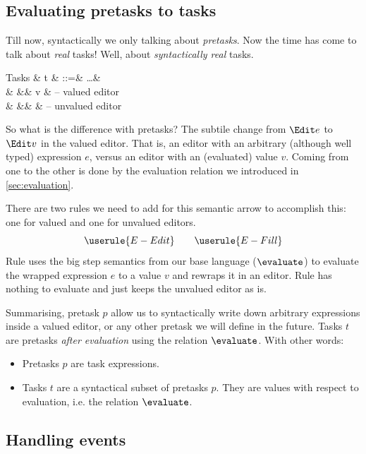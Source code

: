 \subsection{Evaluating pretasks to tasks}
\label{sec:tasks-vs-pretasks}

Till now, syntactically we only talking about \emph{pretasks}.
Now the time has come to talk about \emph{real} tasks!
Well, about \emph{syntactically real} tasks.
\begin{grammar}
  Tasks
    & t & ::=& \ldots      & \\
    &   &\mid& \Edit v     & – valued editor \\
    &   &\mid& \Fill \beta & – unvalued editor \\
\end{grammar}

So what is the difference with pretasks?
The subtile change from $\Edit e$ to $\Edit v$ in the valued editor.
That is, an editor with an arbitrary (although well typed) expression $e$,
versus an editor with an (evaluated) value $v$.
Coming from one to the other is done by the evaluation relation we introduced in \autoref{sec:evaluation}.

There are two rules we need to add for this semantic arrow to accomplish this:
one for valued and one for unvalued editors.
\begin{equation*}
  \userule{E-Edit} \qquad \userule{E-Fill}
\end{equation*}
Rule  uses the big step semantics from our base language ($\evaluate$)
to evaluate the wrapped expression $e$ to a value $v$ and rewraps it in an editor.
Rule  has nothing to evaluate and just keeps the unvalued editor as is.

Summarising, pretask $p$ allow us to syntactically write down arbitrary expressions inside a valued editor,
or any other pretask we will define in the future.
Tasks $t$ are pretasks \emph{after evaluation} using the relation $\evaluate$.
With other words:
\begin{itemize}
  \item
    Pretasks $p$ are task expressions.
  \item
    Tasks $t$ are a syntactical subset of pretasks $p$.
    They are values with respect to evaluation, i.e. the relation $\evaluate$.
\end{itemize}


\subsection{Handling events}
\label{sec:handling}

